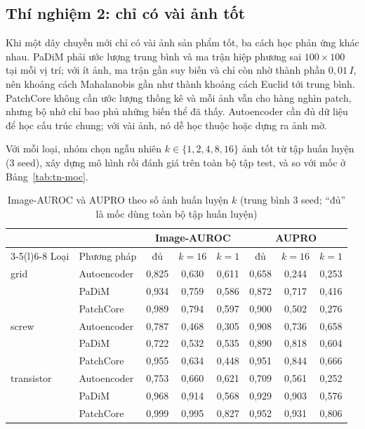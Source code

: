 \subsection{Thí nghiệm 2: chỉ có vài ảnh tốt}
\label{sec:tn2}

Khi một dây chuyền mới chỉ có vài ảnh sản phẩm tốt, ba cách học phản ứng khác nhau. PaDiM phải ước lượng trung bình
và ma trận hiệp phương sai $100\times100$ tại mỗi vị trí; với ít ảnh, ma trận gần suy biến và chỉ còn nhờ thành phần
$0{,}01\,I$, nên khoảng cách Mahalanobis gần như thành khoảng cách Euclid tới trung bình. PatchCore không cần ước lượng
thống kê và mỗi ảnh vẫn cho hàng nghìn patch, nhưng bộ nhớ chỉ bao phủ những biến thể đã thấy. Autoencoder cần đủ dữ
liệu để học cấu trúc chung; với vài ảnh, nó dễ học thuộc hoặc dựng ra ảnh mờ.

Với mỗi loại, nhóm chọn ngẫu nhiên $k \in \{1, 2, 4, 8, 16\}$ ảnh tốt từ tập huấn luyện (3 seed), xây dựng mô hình rồi
đánh giá trên toàn bộ tập test, và so với mốc ở Bảng~\ref{tab:tn-moc}.

\begin{table}[htbp]
  \centering
  \caption[Image-AUROC và AUPRO theo số ảnh huấn luyện $k$]{Image-AUROC và AUPRO theo số ảnh huấn luyện $k$ (trung bình 3
    seed; ``đủ'' là mốc dùng toàn bộ tập huấn luyện)}
  \label{tab:tn2}
  \small
  \begin{tabular}{@{}llcccccc@{}}
    \toprule
    & & \multicolumn{3}{c}{Image-AUROC} & \multicolumn{3}{c}{AUPRO} \\
    \cmidrule(lr){3-5}\cmidrule(l){6-8}
    Loại & Phương pháp & đủ & $k = 16$ & $k = 1$ & đủ & $k = 16$ & $k = 1$ \\
    \midrule
    grid       & Autoencoder & 0,825 & 0,630 & 0,611 & 0,658 & 0,244 & 0,253 \\
               & PaDiM       & 0,934 & 0,759 & 0,586 & 0,872 & 0,717 & 0,416 \\
               & PatchCore   & 0,989 & 0,794 & 0,597 & 0,900 & 0,502 & 0,276 \\
    \midrule
    screw      & Autoencoder & 0,787 & 0,468 & 0,305 & 0,908 & 0,736 & 0,658 \\
               & PaDiM       & 0,722 & 0,532 & 0,535 & 0,890 & 0,818 & 0,604 \\
               & PatchCore   & 0,955 & 0,634 & 0,448 & 0,951 & 0,844 & 0,666 \\
    \midrule
    transistor & Autoencoder & 0,753 & 0,660 & 0,621 & 0,709 & 0,561 & 0,252 \\
               & PaDiM       & 0,968 & 0,914 & 0,568 & 0,929 & 0,903 & 0,576 \\
               & PatchCore   & 0,999 & 0,995 & 0,827 & 0,952 & 0,931 & 0,806 \\
    \bottomrule
  \end{tabular}
\end{table}

